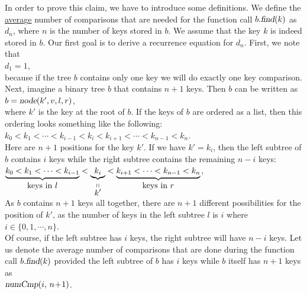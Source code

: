 In order to prove this claim, we have to introduce some definitions.
We define the \underline{avera}g\underline{e} number of comparisons that are needed for the function
call $b.\textsl{find}(k)$ as  $d_n$, where $n$ is the number of keys stored in $b$.  We assume that
the key $k$ is indeed stored in $b$.  Our first goal is to derive a recurrence equation for 
$d_n$.  First, we note that  
\\[0.2cm]
\hspace*{1.3cm} $d_1 = 1$,
\\[0.2cm]
because if the tree $b$ contains only one key we will do exactly one key comparison.
Next, imagine a binary tree $b$ that contains $n+1$ keys.  Then $b$
can be written as 
\\[0.2cm]
\hspace*{1.3cm}
$b = \textsl{node}(k',v,l,r)$,
\\[0.2cm]
where $k'$ is the key at the root of $b$.  If the keys of $b$ are ordered as a list, then this
ordering looks something like the following:
\\[0.2cm]
\hspace*{1.3cm}
$k_0 < k_1 < \cdots < k_{i-1} < k_{i} < k_{i+1} < \cdots < k_{n-1} < k_n$.
\\[0.2cm]
Here are $n+1$ positions for the key $k'$.
If we have $k' = k_i$, then the left subtree of $b$ contains  $i$ keys while the right subtree
contains the remaining  $n-i$ keys:
\\[0.2cm]
\hspace*{1.3cm}
$\underbrace{k_0 < k_1 < \cdots < k_{i-1}}_{\mbox{keys in $l$}} < 
 \underbrace{k_{i}}_{\stackrel{\displaystyle \shortparallel}{\displaystyle k'}} < 
 \underbrace{k_{i+1} < \cdots < k_{n-1} < k_n}_{\mbox{keys in $r$}}$,
\\[0.2cm]
As  $b$ contains $n+1$ keys all together, there are  $n+1$ different possibilities for the position
of $k'$, as the number of keys in the left subtree $l$ is $i$ where
\\[0.2cm]
\hspace*{1.3cm}
 $i \in \{0,1, \cdots, n\}$.
\\[0.2cm]
Of course, if the left subtree has $i$ keys, the right subtree will have $n-i$ keys.
Let us denote the average number of comparisons that are done during the function call
$b.\textsl{find}(k)$ provided the left subtree of $b$ has $i$ keys while $b$ itself has $n+1$ keys
as
\\[0.2cm]
\hspace*{1.3cm}
$\textsl{numCmp}(i,\, n\!+\!1)$.
